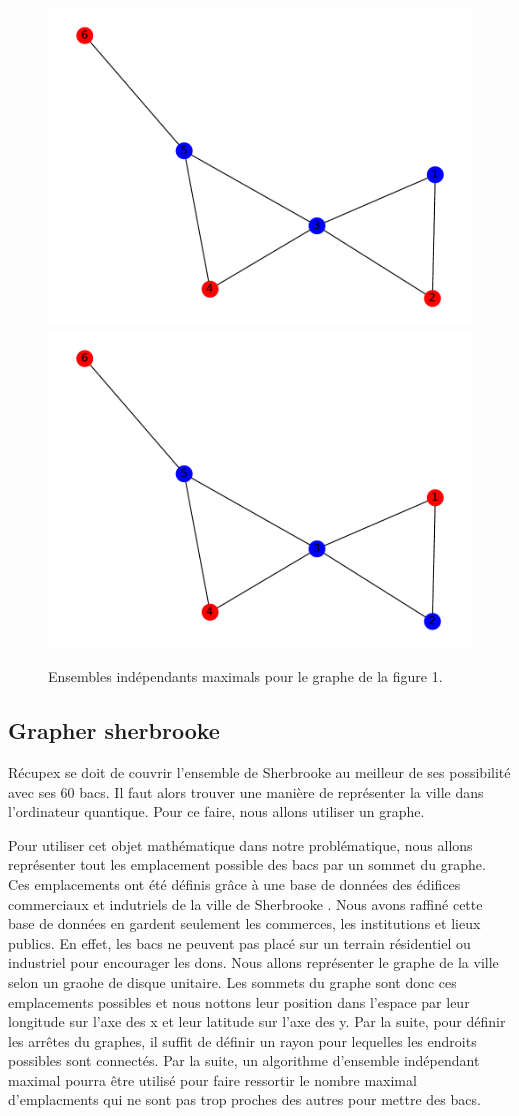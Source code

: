 \documentclass[11pt]{article}
\begin{document}
\begin{figure}[H]
    \centering
    \includegraphics[width=0.4\linewidth]{images/graphe_MIS_1.pdf}
    \includegraphics[width=0.4\linewidth]{images/graphe_MIS_2.pdf}
    \caption{Ensembles indépendants maximals pour le graphe de la figure 1.}
    \label{MIS_exemple}
\end{figure}



\subsection{Grapher sherbrooke}
Récupex se doit de couvrir l'ensemble de Sherbrooke au meilleur de ses possibilité avec ses 60 bacs. Il faut alors trouver une manière de représenter la ville dans l'ordinateur quantique. Pour ce faire,  nous allons utiliser un graphe. 

Pour utiliser cet objet mathématique dans notre problématique, nous allons représenter tout les emplacement possible des bacs par un sommet du graphe. Ces emplacements ont été définis grâce à une base de données des édifices commerciaux et indutriels de la ville de Sherbrooke \cite{noauthor_repertoire_nodate}. Nous avons raffiné cette base de données en gardent seulement les commerces, les institutions et lieux publics. En effet, les bacs ne peuvent pas placé sur un terrain résidentiel ou industriel pour encourager les dons. Nous allons représenter le graphe de la ville selon un graohe de disque unitaire. Les sommets du graphe sont donc ces emplacements possibles et nous nottons leur position dans l'espace par leur longitude sur l'axe des x et leur latitude sur l'axe des y. Par la suite, pour définir les arrêtes du graphes, il suffit de définir un rayon pour lequelles les endroits possibles sont connectés. Par la suite, un algorithme d'ensemble indépendant maximal pourra être utilisé pour faire ressortir le nombre maximal d'emplacments qui ne sont pas trop proches des autres pour mettre des bacs.
\end{document}
